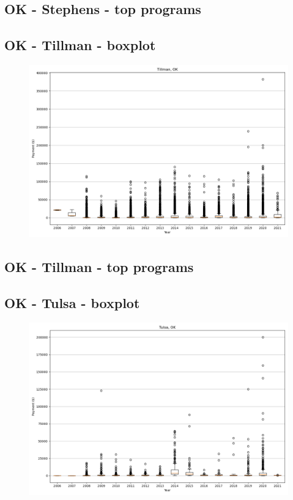 \subsection*{OK - Stephens - top programs}

\newpage
\subsection*{OK - Tillman - boxplot}
\begin{figure}[h]
\centering
\includegraphics[width=7in]{../output/boxplots/counties/Tillman-OK_boxplot.png}
\end{figure}


\subsection*{OK - Tillman - top programs}

\newpage
\subsection*{OK - Tulsa - boxplot}
\begin{figure}[h]
\centering
\includegraphics[width=7in]{../output/boxplots/counties/Tulsa-OK_boxplot.png}
\end{figure}


